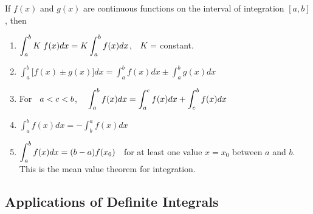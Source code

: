 \documentclass[11pt,a4paper]{article}
\theoremstyle{definition}
\begin{document}
If $f(x)$ and $g(x)$ are continuous functions on the interval of integration $[a,b]$, then
\begin{enumerate}
\item $\displaystyle{\int^b_a  K\hspace{0.1cm} f(x) dx = K\int^b_a f(x) dx}$, $\hspace{0.2cm} K = $ constant.

\item $\displaystyle{\int^b_a \Big[ f(x)\pm g(x)\Big] dx = \int^b_a f(x) dx \pm \int^b_a g(x) dx}$

\item For $\hspace{0.2cm} a < c < b$, $\hspace{0.3cm}\displaystyle{\int^b_a f(x) dx  = \int^c_a f(x) dx   +   \int^b_c f(x) dx}$

\item $\displaystyle{\int^b_a f(x) dx = - \int^a_b f(x) dx}$

\item $\displaystyle{\int^b_a f(x) dx = (b- a) f(x_0)}\hspace{0.2cm}$
for at least one value $x = x_0$ between $a$ and $b$. This is the mean value theorem for integration.
\end{enumerate}

\subsection{Applications of Definite Integrals}
\end{document}
